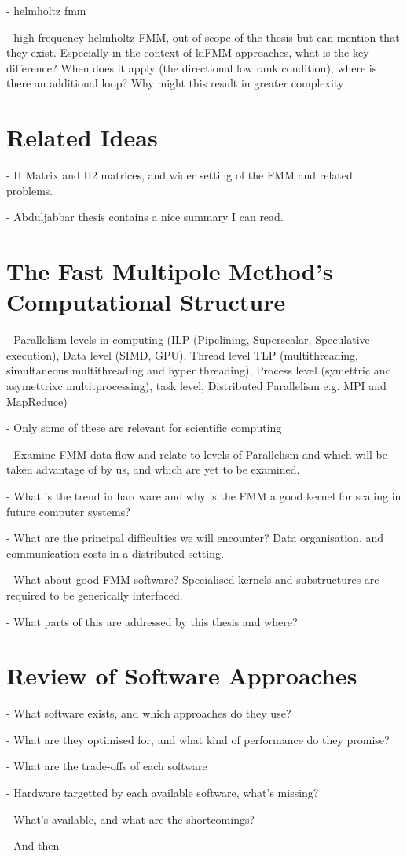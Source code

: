 - helmholtz fmm

- high frequency helmholtz FMM, out of scope of the thesis but can mention that they exist. Especially in the context of kiFMM approaches, what is the key difference? When does it apply (the directional low rank condition), where is there an additional loop? Why might this result in greater complexity

\section{Related Ideas}

- H Matrix and H2 matrices, and wider setting of the FMM and related problems.

- Abduljabbar thesis contains a nice summary I can read.


\section{The Fast Multipole Method's Computational Structure}

- Parallelism levels in computing (ILP (Pipelining, Superscalar, Speculative execution), Data level (SIMD, GPU), Thread level TLP (multithreading, simultaneous multithreading and hyper threading), Process level (symettric and asymettrixc multitprocessing), task level, Distributed Parallelism e.g. MPI and MapReduce)

- Only some of these are relevant for scientific computing

- Examine FMM data flow and relate to levels of Parallelism and which will be taken advantage of by us, and which are yet to be examined.

- What is the trend in hardware and why is the FMM a good kernel for scaling in future computer systems?

- What are the principal difficulties we will encounter? Data organisation, and communication costs in a distributed setting.

- What about good FMM software? Specialised kernels and substructures are required to be generically interfaced.

- What parts of this are addressed by this thesis and where?


\section{Review of Software Approaches}

- What software exists, and which approaches do they use?

- What are they optimised for, and what kind of performance do they promise?

- What are the trade-offs of each software

- Hardware targetted by each available software, what's missing?

- What's available, and what are the shortcomings?

- And then

